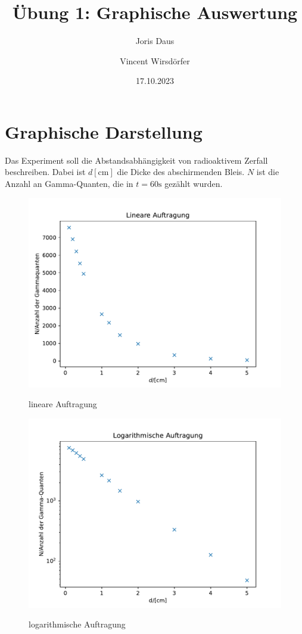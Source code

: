 

\title{Übung 1: Graphische Auswertung}
\author{Joris Daus \and Vincent Wirsdörfer}
\date{17.10.2023}


\maketitle
    	\section{Graphische Darstellung}
            Das Experiment soll die Abstandsabhängigkeit von radioaktivem Zerfall beschreiben.
            Dabei ist $d [\unit{\centi\meter}]$ die Dicke des abschirmenden Bleis. $N$ ist die Anzahl an 
            Gamma-Quanten, die in $t = 60 \unit{\second}$ gezählt wurden.
%           
        \begin{figure}%
                \centering
                \includegraphics{Auswertung_linear}
                \label{fig:lin}
                \caption{lineare Auftragung}
        \end{figure}
%
        \begin{figure}%
                \centering
                \includegraphics{Auswertung_log}
                \label{fig:log}
                \caption{logarithmische Auftragung}    
        \end{figure}
%

